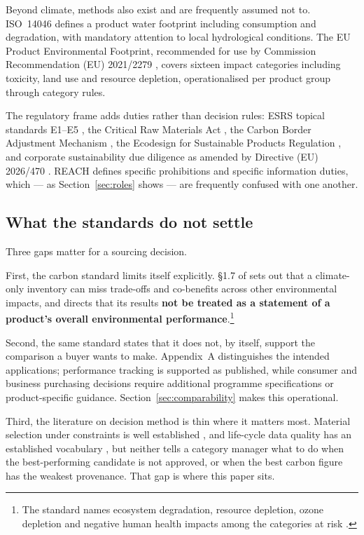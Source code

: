\documentclass[10pt,twocolumn,a4paper]{article}
\begin{document}
Beyond climate, methods also exist and are frequently assumed not to.
ISO~14046 \cite{v3} defines a product water footprint including consumption and
degradation, with mandatory attention to local hydrological conditions. The EU
Product Environmental Footprint, recommended for use by Commission Recommendation
(EU) 2021/2279 \cite{v4}, covers sixteen impact categories including toxicity,
land use and resource depletion, operationalised per product group through
category rules.

The regulatory frame adds duties rather than decision rules: ESRS topical
standards E1--E5 \cite{a4}, the Critical Raw Materials Act \cite{a3}, the Carbon
Border Adjustment Mechanism \cite{a7}, the Ecodesign for Sustainable Products
Regulation \cite{a6}, and corporate sustainability due diligence as amended by
Directive (EU) 2026/470 \cite{p5,v1}. REACH \cite{v2,p4} defines specific
prohibitions and specific information duties, which --- as Section~\ref{sec:roles}
shows --- are frequently confused with one another.

\subsection{What the standards do not settle}

Three gaps matter for a sourcing decision.

First, the carbon standard limits itself explicitly. \S1.7 of \cite{p1} sets out
that a climate-only inventory can miss trade-offs and co-benefits across other
environmental impacts, and directs that its results \textbf{not be treated as a
statement of a product's overall environmental performance}.\footnote{The
standard names ecosystem degradation, resource depletion, ozone depletion and
negative human health impacts among the categories at risk \cite{p1}.}

Second, the same standard states that it does not, by itself, support the
comparison a buyer wants to make. Appendix~A distinguishes the intended
applications; performance tracking is supported as published, while consumer and
business purchasing decisions require additional programme specifications or
product-specific guidance. Section~\ref{sec:comparability} makes this operational.

Third, the literature on decision method is thin where it matters most. Material
selection under constraints is well established \cite{c6,c5}, and life-cycle data
quality has an established vocabulary \cite{a2,c7}, but neither tells a category
manager what to do when the best-performing candidate is not approved, or when the
best carbon figure has the weakest provenance. That gap is where this paper sits.
\end{document}
